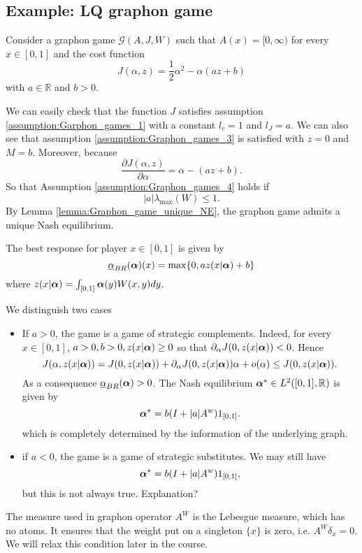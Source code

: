 \subsection{Example: LQ graphon game}

Consider a graphon game $\mathcal{G}(A,J,W)$ such that $A(x) =[0,\infty)$ for every $x \in [0,1]$ and the cost function
$$
	J(\alpha,z) = \frac{1}{2} \alpha^2 - \alpha ( a z + b)
$$
with $a\in \mathbb{R}$ and $b >0$. 

We can easily check that the function $J$ satisfies assumption \ref{assumption:Garphon_games_1} with a constant $l_c = 1$ and $l_J = a$. We can also see that assumption \ref{assumption:Graphon_games_3} is satisfied with $\hat{z} = 0$ and $M = b$. Moreover, because
$$
	\frac{\partial J(\alpha, z)}{\partial \alpha} = \alpha - (az + b).
$$
So that Assumption \ref{assumption:Graphon_games_4} holds if
$$
	\vert a \vert \lambda_{\max}(W) \leq 1.
$$
By Lemma \ref{lemma:Graphon_game_unique_NE}, the graphon game admits a unique Nash equilibrium.

The best response for player $x \in [0,1]$ is given by
$$
	\underline{\alpha}_{BR}(\boldsymbol{\alpha})(x) = \max\{0, a z(x|\boldsymbol{\alpha}) + b \}
$$
where $z(x | \boldsymbol{\alpha}) = \int_{[0,1]} \boldsymbol{\alpha}(y) W(x,y) dy$.

We distinguish two cases
\begin{itemize}
	\item If $a >0$, the game is a game of strategic complements. Indeed, for every $x\in [0,1]$, $a>0, b>0, z(x|\boldsymbol{\alpha}) \geq 0$ so that $\partial_\alpha J(0, z(x|\boldsymbol{\alpha})) < 0$. Hence
	$$
		J(\alpha, z(x | \boldsymbol{\alpha})) = J(0, z(x | \boldsymbol{\alpha})) + \partial_\alpha J(0, z(x | \boldsymbol{\alpha})) \alpha + o(\alpha) \leq J(0, z(x | \boldsymbol{\alpha})).
	$$
	As a consequence $\underline{\alpha}_{BR}(\boldsymbol{\alpha}) > 0$. The Nash equilibrium $\boldsymbol{\alpha}^* \in L^2([0,1], \mathbb{R})$ is given by
	$$
		\boldsymbol{\alpha}^* = b ( I + \vert a \vert A^w) 1_{[0,1]}.
	$$
	which is completely determined by the information of the underlying graph.
	\item if $a < 0$, the game is a game of strategic substitutes. We may still have
	$$
		\boldsymbol{\alpha}^* = b ( I + \vert a \vert A^w) 1_{[0,1]},
	$$
	but this is not always true. {\color{red} Explanation? }
\end{itemize}

\begin{remark}
	The measure used in graphon operator $A^W$ is the Lebesgue measure, which has no atoms. It ensures that the weight put on a singleton $\{x\}$ is zero, i.e. $A^W \delta_{x} = 0$. We will relax this condition later in the course.
\end{remark}



